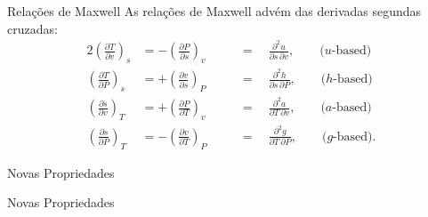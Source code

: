     \begin{frame}{Relações de Maxwell}\vspace*{-1em}
        As relações de Maxwell advém das derivadas segundas cruzadas:
        \begin{alignat*}{2}
            \left(\frac{\partial T}{\partial v}\right)_s    &=  -\left(\frac{\partial P}{\partial s}\right)_v   &   \quad
                                                            &=  \quad\frac{\partial^2 u}{\partial s\,\partial v},
            \qquad\mbox{($u$-based)}    \label{eq:Maxwell.u}    \\
            \left(\frac{\partial T}{\partial P}\right)_s    &=  +\left(\frac{\partial v}{\partial s}\right)_P   &
                                                            &= \quad\frac{\partial^2 h}{\partial s\,\partial P},
            \qquad\mbox{($h$-based)}    \label{eq:Maxwell.h}    \\
            \left(\frac{\partial s}{\partial v}\right)_T    &=  +\left(\frac{\partial P}{\partial T}\right)_v   &
                                                            &=  \quad\frac{\partial^2 a}{\partial T\,\partial v},
            \qquad\mbox{($a$-based)}    \label{eq:Maxwell.a}    \\
            \left(\frac{\partial s}{\partial P}\right)_T    &=  -\left(\frac{\partial v}{\partial T}\right)_P   &
                                                            &=  \quad\frac{\partial^2 g}{\partial T\,\partial P},
            \qquad\mbox{($g$-based)}.   \label{eq:Maxwell.g}
        \end{alignat*}
    \end{frame}

    \begin{frame}{Novas Propriedades}\vspace*{-1em}
    \end{frame}

    \begin{frame}{Novas Propriedades}\vspace*{-1em}
    \end{frame}

